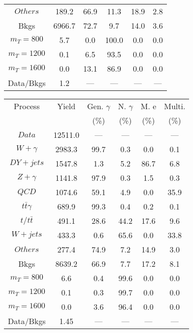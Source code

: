 \begin{figure}
\begin{minipage}[c]{0.32\textwidth}
{\begin{tabular}{cccccc}
$ Others $ &  189.2 &  66.9 &  11.3 &  18.9 &  2.8\\
Bkgs &  6966.7 &  72.7 &  9.7 &  14.0 &  3.6\\
$ m_{T} = 800 $ &  5.7 &  0.0 &  100.0 &  0.0 &  0.0\\
$ m_{T} = 1200 $ &  0.1 &  6.5 &  93.5 &  0.0 &  0.0\\
$ m_{T} = 1600 $ &  0.0 &  13.1 &  86.9 &  0.0 &  0.0\\
Data/Bkgs &  1.2 &  --- &  --- &  --- &  ---\\
\hline
\end{tabular}
}
\end{minipage}
\begin{minipage}[c]{0.32\textwidth}
\centering
\tiny{
\begin{tabular}{cccccc}
\hline
Process & Yield & Gen. $\gamma$ & N. $\gamma$ & M. e & Multi. \\
 &  & (\%) & (\%) & (\%) & (\%)  \\
\hline
                                                                      $ Data $ &  12511.0 &  --- &  --- &  --- &  ---\\
$ W+\gamma $ &  2983.3 &  99.7 &  0.3 &  0.0 &  0.1\\
$ DY+jets $ &  1547.8 &  1.3 &  5.2 &  86.7 &  6.8\\
$ Z+\gamma $ &  1141.8 &  97.9 &  0.3 &  1.5 &  0.3\\
$ QCD $ &  1074.6 &  59.1 &  4.9 &  0.0 &  35.9\\
$ t\bar{t}\gamma $ &  689.9 &  99.3 &  0.4 &  0.2 &  0.1\\
$ t/t\bar{t} $ &  491.1 &  28.6 &  44.2 &  17.6 &  9.6\\
$ W+jets $ &  433.3 &  0.6 &  65.6 &  0.0 &  33.8\\
$ Others $ &  277.4 &  74.9 &  7.2 &  14.9 &  3.0\\
Bkgs &  8639.2 &  66.9 &  7.7 &  17.2 &  8.1\\
$ m_{T} = 800 $ &  6.6 &  0.4 &  99.6 &  0.0 &  0.0\\
$ m_{T} = 1200 $ &  0.1 &  0.3 &  99.7 &  0.0 &  0.0\\
$ m_{T} = 1600 $ &  0.0 &  3.6 &  96.4 &  0.0 &  0.0\\
Data/Bkgs &  1.45 &  --- &  --- &  --- &  ---\\
\hline
\end{tabular}
}
\end{minipage}
\begin{minipage}[c]{0.32\textwidth}
\centering
\tiny{
}
\end{minipage}
\end{figure}

